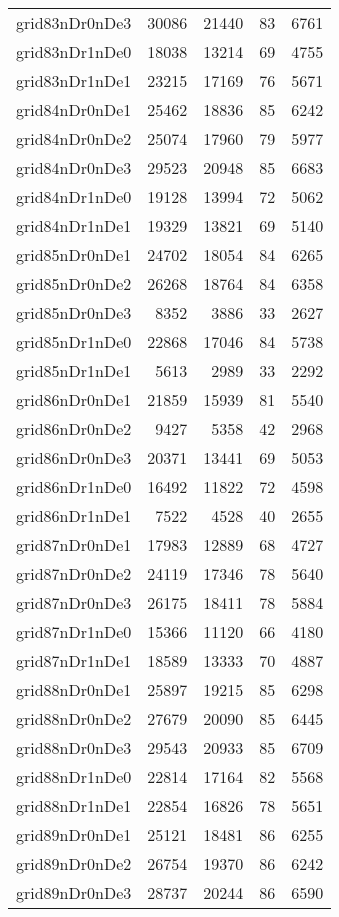 \begin{longtable}{lrrrr}
grid83nDr0nDe3 & 30086 & 21440 & 83 & 6761 \\
grid83nDr1nDe0 & 18038 & 13214 & 69 & 4755 \\
grid83nDr1nDe1 & 23215 & 17169 & 76 & 5671 \\
grid84nDr0nDe1 & 25462 & 18836 & 85 & 6242 \\
grid84nDr0nDe2 & 25074 & 17960 & 79 & 5977 \\
grid84nDr0nDe3 & 29523 & 20948 & 85 & 6683 \\
grid84nDr1nDe0 & 19128 & 13994 & 72 & 5062 \\
grid84nDr1nDe1 & 19329 & 13821 & 69 & 5140 \\
grid85nDr0nDe1 & 24702 & 18054 & 84 & 6265 \\
grid85nDr0nDe2 & 26268 & 18764 & 84 & 6358 \\
grid85nDr0nDe3 & 8352 & 3886 & 33 & 2627 \\
grid85nDr1nDe0 & 22868 & 17046 & 84 & 5738 \\
grid85nDr1nDe1 & 5613 & 2989 & 33 & 2292 \\
grid86nDr0nDe1 & 21859 & 15939 & 81 & 5540 \\
grid86nDr0nDe2 & 9427 & 5358 & 42 & 2968 \\
grid86nDr0nDe3 & 20371 & 13441 & 69 & 5053 \\
grid86nDr1nDe0 & 16492 & 11822 & 72 & 4598 \\
grid86nDr1nDe1 & 7522 & 4528 & 40 & 2655 \\
grid87nDr0nDe1 & 17983 & 12889 & 68 & 4727 \\
grid87nDr0nDe2 & 24119 & 17346 & 78 & 5640 \\
grid87nDr0nDe3 & 26175 & 18411 & 78 & 5884 \\
grid87nDr1nDe0 & 15366 & 11120 & 66 & 4180 \\
grid87nDr1nDe1 & 18589 & 13333 & 70 & 4887 \\
grid88nDr0nDe1 & 25897 & 19215 & 85 & 6298 \\
grid88nDr0nDe2 & 27679 & 20090 & 85 & 6445 \\
grid88nDr0nDe3 & 29543 & 20933 & 85 & 6709 \\
grid88nDr1nDe0 & 22814 & 17164 & 82 & 5568 \\
grid88nDr1nDe1 & 22854 & 16826 & 78 & 5651 \\
grid89nDr0nDe1 & 25121 & 18481 & 86 & 6255 \\
grid89nDr0nDe2 & 26754 & 19370 & 86 & 6242 \\
grid89nDr0nDe3 & 28737 & 20244 & 86 & 6590 \\

\end{longtable}
